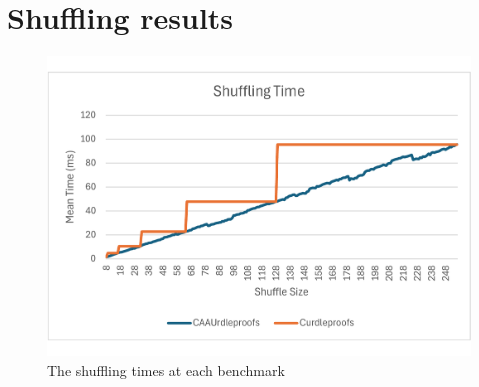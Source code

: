 \section{Shuffling results}\label{sec:shuffling-results}
\begin{figure}[!htb]
    \includegraphics[width=0.99\columnwidth]{figures/results/shufflingtime}
    \caption{The shuffling times at each benchmark}%
    \label{fig:shufflespeed}%
\end{figure}
